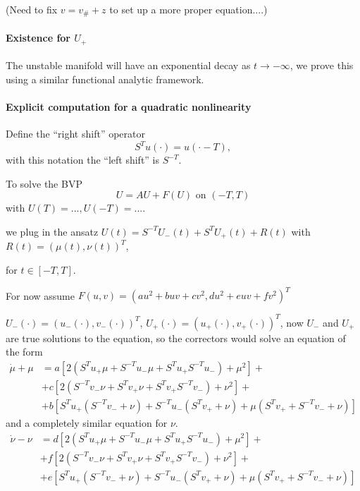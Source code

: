 \documentclass[letterpaper,11pt]{article}
\numberwithin{equation}{section}
\theoremstyle{plain}
\begin{document}
(Need to fix $v=v_\#+z$ to set up a more proper equation....) 

\paragraph{Existence for $U_+$}
The unstable manifold will have an exponential decay as $t \to -\infty$, we prove this using a similar functional analytic framework.

\pagebreak
\iffalse
\paragraph{Explicit computation for a quadratic nonlinearity}

Define the ``right shift'' operator 
\[
S^Tu(\cdot) = u(\cdot-T),
\]
with this notation the ``left shift'' is $S^{-T}$.

To solve the BVP 
\[
U = AU + F(U) \text{ on }(-T,T)
\]
with $U(T)=... , U(-T)=....$

we plug in the ansatz
$U(t) = S^{-T}U_-(t)+S^TU_+(t)+R(t)$ with $R(t) = (\mu(t),\nu(t))^T$,

for $t \in [-T,T]$.

For now assume $F(u,v) = (au^2+buv+cv^2, du^2+euv+fv^2)^T$

$U_-(\cdot) = (u_-(\cdot),v_-(\cdot))^T$, $U_+(\cdot)=(u_+(\cdot),v_+(\cdot))^T$, now $U_-$ and $U_+$ are true solutions to the equation, so the correctors would solve an equation of the form
\begin{align*}
\dot{\mu} + \mu &=   a[2(S^Tu_+\mu+S^{-T}u_- \mu+S^Tu_+S^{-T}u_-)+\mu^2]+\\
&+c[2(S^{-T}v_-\nu+S^Tv_+\nu+S^Tv_+S^{-T}v_-)+\nu^2]+\\
&+b[S^Tu_+(S^{-T}v_-+\nu)+S^{-T}u_-(S^Tv_++\nu)+\mu(S^Tv_++S^{-T}v_-+\nu)]
\end{align*}
and a completely similar equation for $\nu$.
\begin{align*}
\dot{\nu} -\nu &= d[2(S^Tu_+\mu+S^{-T}u_- \mu+S^Tu_+S^{-T}u_-)+\mu^2]+\\
&+f[2(S^{-T}v_-\nu+S^Tv_+\nu+S^Tv_+S^{-T}v_-)+\nu^2]+\\
&+e[S^Tu_+(S^{-T}v_-+\nu)+S^{-T}u_-(S^Tv_++\nu)+\mu(S^Tv_++S^{-T}v_-+\nu)]
\end{align*}
\end{document}
